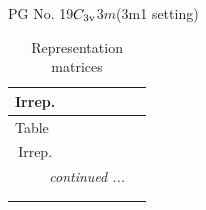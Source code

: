 \documentclass[fleqn,8pt,landscape]{jsarticle}
\begin{document}
\setcounter{MaxMatrixCols}{32}

\renewcommand{\tablename}{Table~}
\renewcommand{\figurename}{Figure~}
\begin{center}
\LARGE
PG No. 19\quad$C_{\rm 3v}$\quad$3m$\quad(3m1 setting)\quad[ trigonal ]
\end{center}
\renewcommand{\arraystretch}{1.2}
\begin{longtable}{ccccccc}
\caption{Representation matrices}
 \\
 \hline \hline
Irrep. &  &  &  &  &  &  \\ \hline \endfirsthead

\multicolumn{6}{l}{\tablename\ \thetable{}} \\
 \hline \hline
Irrep. &  &  &  &  &  &  \\ \hline \endhead

 \hline \hline
\multicolumn{6}{r}{\footnotesize\it continued ...} \\ \endfoot

 \hline \hline
\multicolumn{6}{r}{} \\ \endlastfoot


\end{longtable}
\end{document}
